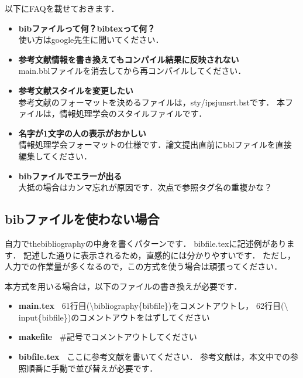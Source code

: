 以下にFAQを載せておきます．
\begin{itemize}
        \item   {\bf bibファイルって何？bibtexって何？}\\
        使い方はgoogle先生に聞いてください．
        \item   {\bf 参考文献情報を書き換えてもコンパイル結果に反映されない}\\
        main.bblファイルを消去してから再コンパイルしてください．
        \item   {\bf 参考文献スタイルを変更したい}\\
        参考文献のフォーマットを決めるファイルは，sty/ipsjunsrt.bstです．
        本ファイルは，情報処理学会のスタイルファイルです．
        \item   {\bf 名字が1文字の人の表示がおかしい}\\
        情報処理学会フォーマットの仕様です．論文提出直前にbblファイルを直接編集してください．
        \item   {\bf bibファイルでエラーが出る}\\
        大抵の場合はカンマ忘れが原因です．次点で参照タグ名の重複かな？
\end{itemize}



\subsection{bibファイルを使わない場合}
自力でthebibliographyの中身を書くパターンです．
bibfile.texに記述例があります．
記述した通りに表示されるため，直感的には分かりやすいです．
ただし，人力での作業量が多くなるので，この方式を使う場合は頑張ってください．

本方式を用いる場合は，以下のファイルの書き換えが必要です．

\begin{itemize}
        \item {\bf main.tex\ }  61行目($\setminus$bibliography\{bibfile\})をコメントアウトし，
                                                62行目($\setminus$input\{bibfile\})のコメントアウトをはずしてください
        \item {\bf makefile\ }  $\#$記号でコメントアウトしてください
        \item {\bf bibfile.tex\ }       ここに参考文献を書いてください．
                                                参考文献は，本文中での参照順番に手動で並び替えが必要です．
\end{itemize}

